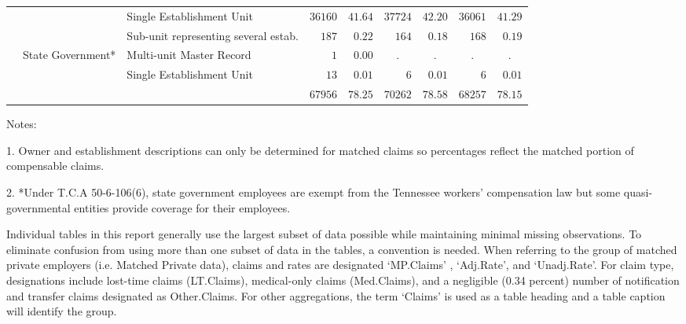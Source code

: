 \documentclass[9pt, oneside]{article}   	%
\begin{document}
\begin{longtable}{lllcccccc}
 &  & Single Establishment Unit  & $36160$ & $41.64$ & $37724$ & $42.20$ & $36061$ & $41.29$ \\
 &  & Sub-unit representing several estab.  & $\phantom{00}187$ & $\phantom{0}0.22$ & $\phantom{00}164$ & $\phantom{0}0.18$ & $\phantom{00}168$ & $\phantom{0}0.19$ \\
 & State Government* & Multi-unit Master Record  & $\phantom{0000}1$ & $\phantom{0}0.00$ & . & . & . & . \\
 &  & Single Establishment Unit  & $\phantom{000}13$ & $\phantom{0}0.01$ & $\phantom{0000}6$ & $\phantom{0}0.01$ & $\phantom{0000}6$ & $\phantom{0}0.01$ \\
\cline{1-1} \cline{2-2} \cline{3-3} \cline{4-4} \cline{5-5} \cline{6-6} \cline{7-7} \cline{8-8} \cline{9-9} %
 &  &   & $67956$ & $78.25$ & $70262$ & $78.58$ & $68257$ & $78.15$ \\
\hline 
\end{longtable}



    \begin{tablenotes}
      \small
      Notes:
      \\
      \item 1. Owner and establishment descriptions can only be determined for matched claims so percentages reflect the matched portion of compensable claims.\\
      \item 2. *Under T.C.A 50-6-106(6), state government employees are exempt from the Tennessee workers' compensation law but some quasi-governmental entities provide coverage for their employees.
    \end{tablenotes}
  




Individual tables in this report generally use the largest subset of data possible while maintaining minimal missing observations.
To eliminate confusion from using more than one subset of data in the tables, a convention is needed. When referring to the group of matched private employers (i.e. Matched Private data), claims and rates are designated `MP.Claims' , `Adj.Rate', and `Unadj.Rate'. For claim type, designations include lost-time claims (LT.Claims), medical-only claims (Med.Claims), and a negligible (0.34 percent) number of notification and transfer claims designated as Other.Claims. For other aggregations, the term `Claims' is used as a table heading and a table caption will identify the group.
\end{document}
